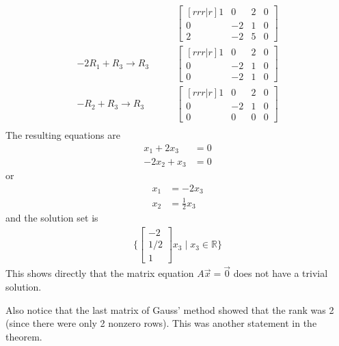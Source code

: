 \begin{example}
\begin{align*}
& \qquad \begin{bmatrix}[rrr|r]
1 & 0 & 2 & 0 \\
0 & -2 & 1 & 0 \\
2 & -2 & 5  & 0 
\end{bmatrix} \\
-2 R_1 + R_3 \rightarrow R_3 
& \qquad \begin{bmatrix}[rrr|r]
1 & 0 & 2 & 0 \\
0 & -2 & 1 & 0 \\
0 & -2 & 1  & 0 
\end{bmatrix} \\
-R_2 + R_3 \rightarrow R_3 
& \qquad \begin{bmatrix}[rrr|r]
1 & 0 & 2 & 0 \\
0 & -2 & 1 & 0 \\
0 & 0 & 0  & 0 
\end{bmatrix} \\
\end{align*} 
The resulting equations are
%
\begin{align*}
x_1 + 2x_3 & = 0 \\
-2x_2 + x_3 & = 0 
\end{align*}
or
\begin{align*}
x_1 & = -2x_3 \\
x_2 & = \frac{1}{2} x_3 
\end{align*}
and the solution set is
%
\begin{align*}
\{ \begin{bmatrix}
-2 \\ 1/2 \\ 1
\end{bmatrix} x_3 \; | \; x_3 \in \mathbb{R} \}
\end{align*}
This shows directly that the matrix equation $A\vec{x}=\vec{0}$ does not have a trivial solution.  
\end{example}

Also notice that the last matrix of Gauss' method showed that the rank was 2 (since there were only 2 nonzero rows).  This was another statement in the theorem.  

